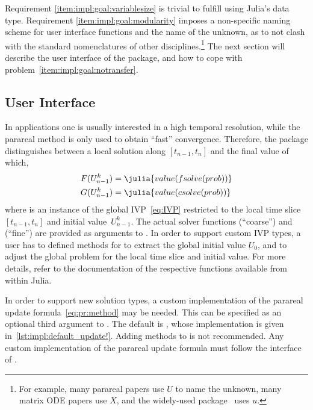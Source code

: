 Requirement \ref{item:impl:goal:variablesize} is trivial to fulfill using Julia's  data type.
Requirement \ref{item:impl:goal:modularity} imposes a non-specific naming scheme for
user interface functions and the name of the unknown,
as to not clash with the standard nomenclatures of other disciplines.\footnote{%
  For example,
  many parareal papers use $U$ to name the unknown,
  many matrix \ac{ODE} papers use $X$,
  and the widely-used  package~\cite{DifferentialEquations} uses $u$.
}
The next section will describe the user interface of the  package,
and how to cope with problem~\ref{item:impl:goal:notransfer}.

\subsection{User Interface}

In applications one is usually interested in a high temporal resolution,
while the parareal method is only used to obtain \enquote{fast} convergence.
Therefore, the  package distinguishes between a local solution along $[t_{n-1}, t_n]$ and the final value of which,
\begin{align*}
  F(U_{n-1}^k) &= \julia{value(fsolve(prob))} \\
  G(U_{n-1}^k) &= \julia{value(csolve(prob))}
\end{align*}
where  is an instance of the global \ac{IVP}~\eqref{eq:IVP}
restricted to the local time slice~$[t_{n-1}, t_n]$ and initial value~$U_{n-1}^k$.
The actual solver functions  (\enquote{coarse}) and  (\enquote{fine})
are provided as arguments to .
In order to support custom \ac{IVP} types,
a user has to defined methods for  to extract the global initial value $U_0$,
and  to adjust the global problem for the local time slice and initial value.
For more details, refer to the documentation of the respective functions available from within Julia.

In order to support new solution types,
a custom implementation of the parareal update formula~\eqref{eq:pr:method} may be needed.
This can be specified as an optional third argument to .
The default is ,
whose implementation is given in~\autoref{lst:impl:default_update!}.
Adding methods to  is not recommended.
Any custom implementation of the parareal update formula must follow the interface of .


